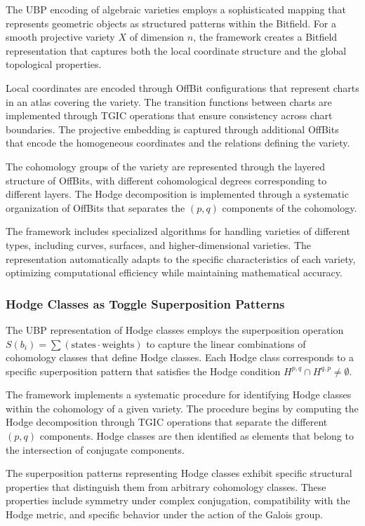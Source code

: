 \documentclass[11pt]{amsart}
\begin{document}
The UBP encoding of algebraic varieties employs a sophisticated mapping that represents geometric objects as structured patterns within the Bitfield. For a smooth projective variety $X$ of dimension $n$, the framework creates a Bitfield representation that captures both the local coordinate structure and the global topological properties.

Local coordinates are encoded through OffBit configurations that represent charts in an atlas covering the variety. The transition functions between charts are implemented through TGIC operations that ensure consistency across chart boundaries. The projective embedding is captured through additional OffBits that encode the homogeneous coordinates and the relations defining the variety.

The cohomology groups of the variety are represented through the layered structure of OffBits, with different cohomological degrees corresponding to different layers. The Hodge decomposition is implemented through a systematic organization of OffBits that separates the $(p,q)$ components of the cohomology.

The framework includes specialized algorithms for handling varieties of different types, including curves, surfaces, and higher-dimensional varieties. The representation automatically adapts to the specific characteristics of each variety, optimizing computational efficiency while maintaining mathematical accuracy.

\subsubsection{Hodge Classes as Toggle Superposition Patterns}

The UBP representation of Hodge classes employs the superposition operation $S(b_i) = \sum(\text{states} \cdot \text{weights})$ to capture the linear combinations of cohomology classes that define Hodge classes. Each Hodge class corresponds to a specific superposition pattern that satisfies the Hodge condition $H^{p,q} \cap H^{q,p} \neq \emptyset$.

The framework implements a systematic procedure for identifying Hodge classes within the cohomology of a given variety. The procedure begins by computing the Hodge decomposition through TGIC operations that separate the different $(p,q)$ components. Hodge classes are then identified as elements that belong to the intersection of conjugate components.

The superposition patterns representing Hodge classes exhibit specific structural properties that distinguish them from arbitrary cohomology classes. These properties include symmetry under complex conjugation, compatibility with the Hodge metric, and specific behavior under the action of the Galois group.
\end{document}

